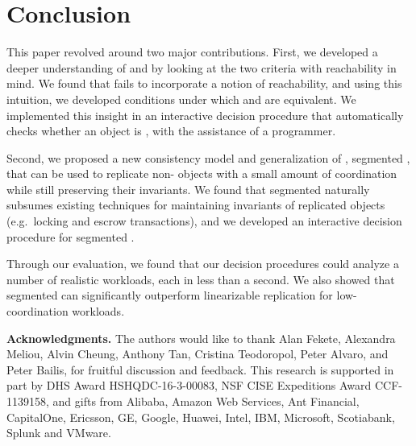 \section{Conclusion}
This paper revolved around two major contributions.
%
First, we developed a deeper understanding of \invariantclosure{} and
\invariantconfluence{} by looking at the two criteria with reachability in
mind. We found that \invariantclosure{} fails to incorporate a notion of
reachability, and using this intuition, we developed conditions under which
\invariantclosure{} and \invariantconfluence{} are equivalent. We implemented
this insight in an interactive \invariantconfluence{} decision procedure
that automatically checks whether an object is \invariantconfluent{}, with the
assistance of a programmer.

Second, we proposed a new consistency model and generalization of
\invariantconfluence{}, segmented \invariantconfluence{}, that can be used to
replicate non-\invariantconfluent{} objects with a small amount of coordination
while still preserving their invariants. We found that segmented
\invariantconfluence{} naturally subsumes existing techniques for maintaining
invariants of replicated objects (e.g.\ locking and escrow transactions), and
we developed an interactive decision procedure for segmented
\invariantconfluence{}.

Through our evaluation, we found that our decision procedures could analyze a
number of realistic workloads, each in less than a second. We also showed that
segmented \invariantconfluence{} can significantly outperform linearizable
replication for low-coordination workloads.

\textbf{Acknowledgments.}
The authors would like to thank Alan Fekete, Alexandra Meliou, Alvin Cheung,
Anthony Tan, Cristina Teodoropol, Peter Alvaro, and Peter Bailis, for fruitful
discussion and feedback.
%
This research is supported in part by DHS Award HSHQDC-16-3-00083, NSF CISE
Expeditions Award CCF-1139158, and gifts from Alibaba, Amazon Web Services, Ant
Financial, CapitalOne, Ericsson, GE, Google, Huawei, Intel, IBM, Microsoft,
Scotiabank, Splunk and VMware.

